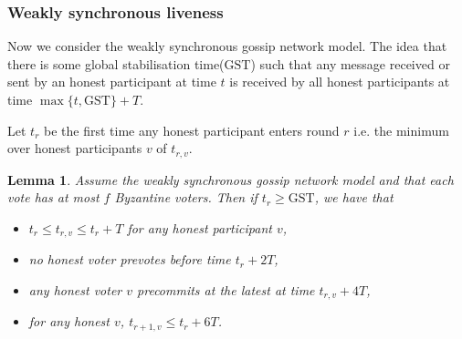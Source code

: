 \documentclass{article}
\newtheorem{lemma}[theorem]{Lemma}
\def\GST{\mathrm{GST}}
\begin{document}
\subsubsection{Weakly synchronous liveness}

Now we consider the weakly synchronous gossip network model. The idea that there is some global stabilisation time($\GST$) such that any message received or sent by an honest participant at time $t$ is received by all honest participants at time $\max\{t,\GST\}+T$.

Let $t_r$ be the first time any honest participant enters round $r$ i.e. the minimum over honest participants $v$ of $t_{r,v}$.

\begin{lemma} \label{lem:timings}
Assume the weakly synchronous gossip network model and that each vote has at most $f$ Byzantine voters. Then if $t_r \geq \GST$, we have that
\begin{itemize}
\item[(i)] $t_r \leq t_{r,v} \leq t_r+T$ for any honest participant $v$,
\item[(ii)] no honest voter prevotes before time $t_r+2T$,
\item[(iii)] any honest voter $v$ precommits at the latest at time $t_{r,v}+4T$,
\item[(iv)] for any honest $v$, $t_{r+1,v} \leq t_r + 6T$.
\end{itemize}
\end{lemma}
\end{document}
